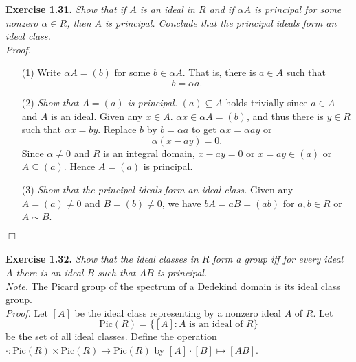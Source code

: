 \documentclass{article}
\begin{document}



\textbf{Exercise 1.31.}
\emph{Show that if $A$ is an ideal in $R$ and if $\alpha A$ is principal
for some nonzero $\alpha \in R$, then $A$ is principal.
Conclude that the principal ideals form an ideal class.} \\

\emph{Proof.}
\begin{enumerate}
\item[(1)]
Write $\alpha A = (b)$ for some $b \in \alpha A$.
That is, there is $a \in A$ such that
$$b = \alpha a.$$
\item[(2)]
\emph{Show that $A = (a)$ is principal.}
$(a) \subseteq A$ holds trivially since $a \in A$ and $A$ is an ideal.
Given any $x \in A$. $\alpha x \in \alpha A = (b)$, and thus
there is $y \in R$ such that $\alpha x = b y$.
Replace $b$ by $b = \alpha a$ to get $\alpha x = \alpha a y$ or
$$\alpha (x - ay) = 0.$$
Since $\alpha \neq 0$ and $R$ is an integral domain,
$x - ay = 0$ or $x = ay \in (a)$ or $A \subseteq (a)$.
Hence $A = (a)$ is principal.
\item[(3)]
\emph{Show that the principal ideals form an ideal class.}
Given any $A = (a) \neq 0$ and $B = (b) \neq 0$,
we have $bA = aB = (ab)$ for $a, b \in R$ or $A \sim B$.
\end{enumerate}
$\Box$ \\\\






\textbf{Exercise 1.32.}
\emph{Show that the ideal classes in $R$ form a group iff for every ideal $A$
there is an ideal $B$ such that $AB$ is principal. } \\

\emph{Note.}
The Picard group of the spectrum of a Dedekind domain is its ideal class group. \\

\emph{Proof.}
Let $[A]$ be the ideal class representing by a nonzero ideal $A$ of $R$.
Let
$$\text{Pic}(R) = \{ [A] : A \text{ is an ideal of } R \}$$
be the set of all ideal classes.
Define the operation $\cdot : \text{Pic}(R) \times \text{Pic}(R) \to \text{Pic}(R)$
by $[A] \cdot [B] \mapsto [AB]$.
\end{document}
